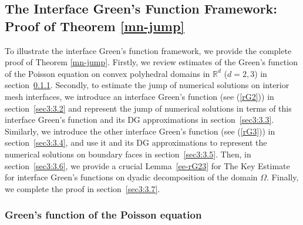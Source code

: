 \documentclass[1996/10/24]{amsart}
\theoremstyle{definition}
\numberwithin{equation}{section}
\begin{document}
\subsection{The Interface Green's Function Framework: Proof of Theorem \ref{mn-jump}}\label{sec3:3}

To illustrate the interface Green's function framework, we provide the complete proof of Theorem \ref{mn-jump}.
Firstly, we review estimates of the Green's function of the Poisson equation on convex polyhedral domains in
$\mathbb{R}^{d}$ ($d=2,3$) in section~\ref{sec3:3.1}. Secondly, to estimate the jump of numerical solutions on
interior mesh interfaces, we introduce
an interface Green's function (see (\ref{rG2})) in section~\ref{sec3:3.2} and represent the jump of numerical solutions
in terms of this interface Green's function and its DG approximations in section~\ref{sec3:3.3}.
Similarly, we introduce the other interface Green's function (see (\ref{rG3})) in section~\ref{sec3:3.4}, and use it and
its DG approximations to represent the numerical solutions on boundary faces in section~\ref{sec3:3.5}.
Then, in section~\ref{sec3:3.6}, we provide a crucial Lemma~\ref{ee-rG23} for The Key Estimate for interface Green's functions
on dyadic decomposition of the domain $\Omega$. Finally, we complete the proof in section~\ref{sec3:3.7}.

\subsubsection{Green's function of the Poisson equation}
\label{sec3:3.1}
\end{document}
